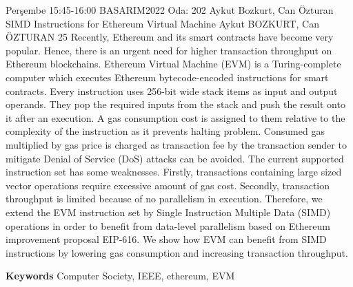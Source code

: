 
    \begin{abstract_basarim}
    {Perşembe 15:45-16:00}
    {BASARIM2022}
    {Oda: 202}
    {Aykut Bozkurt, Can Özturan}
    {SIMD Instructions for Ethereum Virtual Machine}
    {%
    Aykut BOZKURT, Can ÖZTURAN}
    {%
    }
    {%
    25}
    Recently, Ethereum and its smart contracts have become very popular. Hence, there is an urgent need for higher transaction throughput on Ethereum blockchains. Ethereum Virtual Machine (EVM) is a Turing-complete computer which executes Ethereum bytecode-encoded instructions for smart contracts. Every instruction uses 256-bit wide stack items as input and output operands. They pop the required inputs from the stack and push the result onto it after an execution. A gas consumption cost is assigned to them relative to the complexity of the instruction as it prevents halting problem. Consumed gas multiplied by gas price is charged as transaction fee by the transaction sender to mitigate Denial of Service (DoS) attacks can be avoided. The current supported instruction set has some weaknesses. Firstly, transactions containing large sized vector operations require excessive amount of gas cost. Secondly, transaction throughput is limited because of no parallelism in execution. Therefore, we extend the EVM instruction set by Single Instruction Multiple Data (SIMD) operations in order to benefit from data-level parallelism based on Ethereum improvement proposal EIP-616. We show how EVM can benefit from SIMD instructions by lowering gas consumption and increasing transaction throughput. 
    
        \textbf{Keywords} \newline{}Computer Society, IEEE, ethereum, EVM
    \end{abstract_basarim}
    
